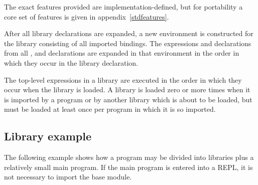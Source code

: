 The exact features provided are implementation-defined, but for
portability a core set of features is given in
appendix~\ref{stdfeatures}.


After all  library declarations are expanded, a new environment is
constructed for the library consisting of all imported bindings.  The
expressions and declarations from all ,  and 
declarations are expanded in that environment in the order in which
they occur in the library declaration.

The top-level expressions in a library are executed in the order in which
they occur when the library is loaded.  A library is loaded zero or more
times when it is imported by a program or by another library which is
about to be loaded, but must be loaded at least once per program in
which it is so imported.


\subsection{Library example}
The following example shows
how a program may be divided into libraries plus a relatively small
main program.
If the main program is entered into a REPL, it is not necessary to import
the base module.


